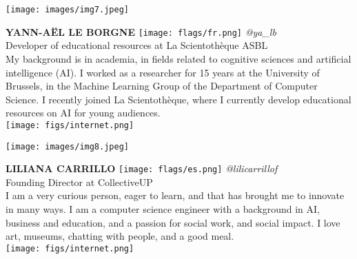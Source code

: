\noindent
\begin{minipage}{0.3\textwidth}
\centering
\texttt{[image: images/img7.jpeg]}
\end{minipage}
\hfill
\begin{minipage}{0.6\textwidth}\raggedright
\color{color1}\uppercase{\textbf{Yann-Aël Le Borgne}}
\color{color2}\hspace{0.2cm}\texttt{[image: flags/fr.png]}
\hspace{0.2cm}\textit{@ya\_lb}
\\
Developer of educational resources at La Scientothèque ASBL\\
{\footnotesize My background is in academia, in fields related to cognitive sciences and artificial intelligence (AI). I worked as a researcher for 15 years at the University of Brussels, in the Machine Learning Group of the Department of Computer Science. I recently joined La Scientothèque, where I currently develop educational resources on AI for young audiences.}\\
\texttt{[image: figs/internet.png]}
\end{minipage}
\newline\newline\newline

\noindent
\begin{minipage}{0.3\textwidth}
\centering
\texttt{[image: images/img8.jpeg]}
\end{minipage}
\hfill
\begin{minipage}{0.6\textwidth}\raggedright
\color{color1}\uppercase{\textbf{Liliana Carrillo}}
\color{color2}\hspace{0.2cm}\texttt{[image: flags/es.png]}
\hspace{0.2cm}\textit{@lilicarrillof}
\\
Founding Director at CollectiveUP\\
{\footnotesize I am a very curious person, eager to learn, and that has brought me to innovate in many ways.  I am a computer science engineer with a background in AI, business and education, and a passion for social work, and social impact.  I love art, museums, chatting with people, and a good meal.}\\
\texttt{[image: figs/internet.png]}
\end{minipage}
\newline\newline\newline

